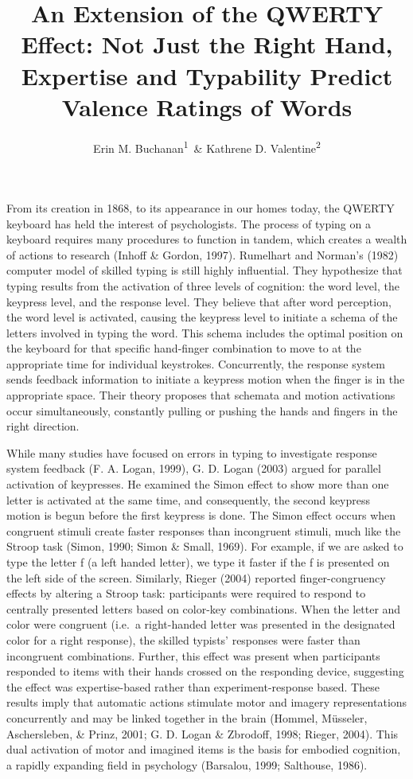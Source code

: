 \documentclass[english,man]{apa6}
\title{An Extension of the QWERTY Effect: Not Just the Right Hand, Expertise
and Typability Predict Valence Ratings of Words}
\author{Erin M. Buchanan\textsuperscript{1}~\& Kathrene D. Valentine\textsuperscript{2}}
\affiliation{
    \vspace{0.5cm}
          \textsuperscript{1} Missouri State University\\
          \textsuperscript{2} University of Missouri  }
\theoremstyle{definition}
\theoremstyle{definition}
\theoremstyle{definition}
\theoremstyle{remark}
\begin{document}
\maketitle

\setcounter{secnumdepth}{0}



From its creation in 1868, to its appearance in our homes today, the
QWERTY keyboard has held the interest of psychologists. The process of
typing on a keyboard requires many procedures to function in tandem,
which creates a wealth of actions to research (Inhoff \& Gordon, 1997).
Rumelhart and Norman's (1982) computer model of skilled typing is still
highly influential. They hypothesize that typing results from the
activation of three levels of cognition: the word level, the keypress
level, and the response level. They believe that after word perception,
the word level is activated, causing the keypress level to initiate a
schema of the letters involved in typing the word. This schema includes
the optimal position on the keyboard for that specific hand-finger
combination to move to at the appropriate time for individual
keystrokes. Concurrently, the response system sends feedback information
to initiate a keypress motion when the finger is in the appropriate
space. Their theory proposes that schemata and motion activations occur
simultaneously, constantly pulling or pushing the hands and fingers in
the right direction.

While many studies have focused on errors in typing to investigate
response system feedback (F. A. Logan, 1999), G. D. Logan (2003) argued
for parallel activation of keypresses. He examined the Simon effect to
show more than one letter is activated at the same time, and
consequently, the second keypress motion is begun before the first
keypress is done. The Simon effect occurs when congruent stimuli create
faster responses than incongruent stimuli, much like the Stroop task
(Simon, 1990; Simon \& Small, 1969). For example, if we are asked to
type the letter f (a left handed letter), we type it faster if the f is
presented on the left side of the screen. Similarly, Rieger (2004)
reported finger-congruency effects by altering a Stroop task:
participants were required to respond to centrally presented letters
based on color-key combinations. When the letter and color were
congruent (i.e.~a right-handed letter was presented in the designated
color for a right response), the skilled typists' responses were faster
than incongruent combinations. Further, this effect was present when
participants responded to items with their hands crossed on the
responding device, suggesting the effect was expertise-based rather than
experiment-response based. These results imply that automatic actions
stimulate motor and imagery representations concurrently and may be
linked together in the brain (Hommel, Müsseler, Aschersleben, \& Prinz,
2001; G. D. Logan \& Zbrodoff, 1998; Rieger, 2004). This dual activation
of motor and imagined items is the basis for embodied cognition, a
rapidly expanding field in psychology (Barsalou, 1999; Salthouse, 1986).
\end{document}
